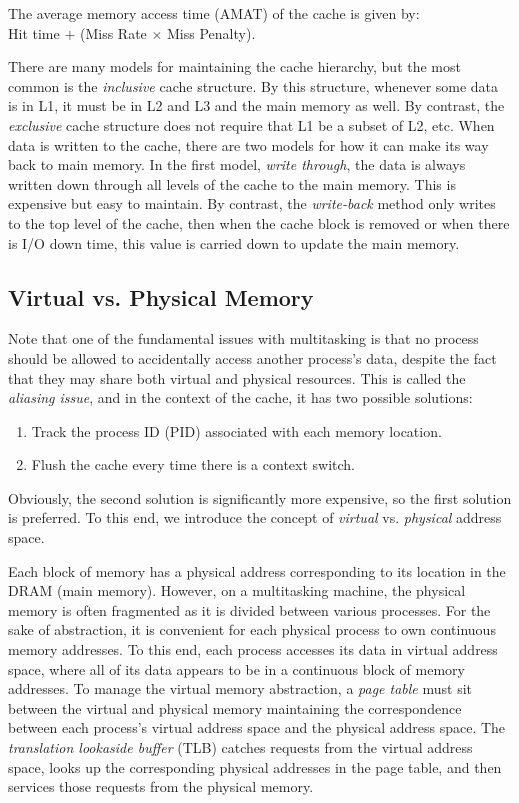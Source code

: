 \documentclass[12pt]{article}
\begin{document}
The average memory access time (AMAT) of the cache is given by:\\
Hit time $+$ (Miss Rate $\times$ Miss Penalty).

There are many models for maintaining the cache hierarchy, but the most
common is the {\it inclusive} cache structure.
By this structure, whenever some data is in L1, it must be in L2 and L3 and
the main memory as well.
By contrast, the {\it exclusive} cache structure does not require that L1 be
a subset of L2, etc.
When data is written to the cache, there are two models for how it can make
its way back to main memory.
In the first model, {\it write through}, the data is always written down through
all levels of the cache to the main memory.
This is expensive but easy to maintain.
By contrast, the {\it write-back} method only writes to the top level of the 
cache, then when the cache block is removed or when there is I/O down time, 
this value is carried down to update the main memory.

\subsection*{Virtual vs. Physical Memory}

Note that one of the fundamental issues with multitasking is that no process 
should be allowed to accidentally access another process's data, despite the 
fact that they may share both virtual and physical resources.
This is called the {\it aliasing issue}, and in the context of the cache, it 
has two possible solutions:
\begin{enumerate}
\item Track the process ID (PID) associated with each memory location.
\item Flush the cache every time there is a context switch.
\end{enumerate}
Obviously, the second solution is significantly more expensive, so the first
solution is preferred.
To this end, we introduce the concept of {\it virtual} vs. {\it physical}
address space.

Each block of memory has a physical address corresponding to its location in
the DRAM (main memory).
However, on a multitasking machine, the physical memory is often fragmented as 
it is divided between various processes.
For the sake of abstraction, it is convenient for each physical process to
own continuous memory addresses.
To this end, each process accesses its data in virtual address space, where
all of its data appears to be in a continuous block of memory addresses.
To manage the virtual memory abstraction, a {\it page table} must sit between
the virtual and physical memory maintaining the correspondence between each
process's virtual address space and the physical address space.
The {\it translation lookaside buffer} (TLB) catches requests from
the virtual address space, looks up the corresponding physical addresses
in the page table, and then services those requests from the physical memory.
\end{document}
